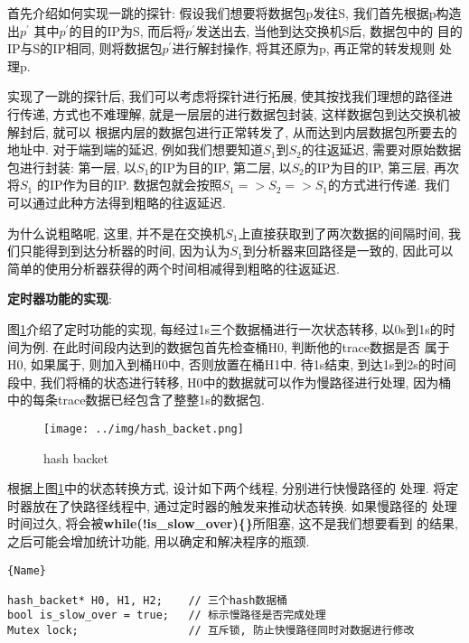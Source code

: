 首先介绍如何实现一跳的探针: 假设我们想要将数据包p发往S,
我们首先根据p构造出\(p^{'}\) 其中\(p^{'}\)的目的IP为S,
而后将\(p^{'}\)发送出去, 当他到达交换机S后, 数据包中的
目的IP与S的IP相同, 则将数据包\(p^{'}\)进行解封操作, 将其还原为p,
再正常的转发规则 处理p.

实现了一跳的探针后, 我们可以考虑将探针进行拓展,
使其按找我们理想的路径进行传递, 方式也不难理解,
就是一层层的进行数据包封装, 这样数据包到达交换机被解封后, 就可以
根据内层的数据包进行正常转发了, 从而达到内层数据包所要去的地址中.
对于端到端的延迟, 例如我们想要知道\(S_{1}\)到\(S_{2}\)的往返延迟,
需要对原始数据包进行封装: 第一层, 以\(S_{1}\)的IP为目的IP, 第二层,
以\(S_{2}\)的IP为目的IP, 第三层, 再次将\(S_{1}\) 的IP作为目的IP.
数据包就会按照\(S_{1} => S_{2} => S_{1}\)的方式进行传递. 我们
可以通过此种方法得到粗略的往返延迟.

为什么说粗略呢, 这里,
并不是在交换机\(S_{1}\)上直接获取到了两次数据的间隔时间,
我们只能得到到达分析器的时间, 因为认为\(S_{1}\)到分析器来回路径是一致的,
因此可以 简单的使用分析器获得的两个时间相减得到粗略的往返延迟.


\textbf{定时器功能的实现}:

图\ref{fig:hash_backet}介绍了定时功能的实现, 每经过1s三个数据桶进行一次状态转移,
以0s到1s的时间为例. 在此时间段内达到的数据包首先检查桶H0, 判断他的trace数据是否
属于H0, 如果属于, 则加入到桶H0中, 否则放置在桶H1中. 待1s结束, 到达1s到2s的时间段中,
我们将桶的状态进行转移, H0中的数据就可以作为慢路径进行处理,
因为桶中的每条trace数据已经包含了整整1s的数据包.

\begin{center}
\end{center}

\begin{figure}[htbp!]
  \centering 
  \texttt{[image: ../img/hash\_backet.png]}
  \caption{hash backet}
  \label{fig:hash_backet}
\end{figure}


  根据上图\ref{fig:hash_backet}中的状态转换方式, 设计如下两个线程, 分别进行快慢路径的
处理. 将定时器放在了快路径线程中, 通过定时器的触发来推动状态转换. 如果慢路径的
处理时间过久, 将会被\textbf{while(!is\_slow\_over)\{\}}所阻塞, 这不是我们想要看到
的结果, 之后可能会增加统计功能, 用以确定和解决程序的瓶颈.

\begin{lstlisting}[caption=数据结构,frame=tlrb]{Name}

hash_backet* H0, H1, H2;    // 三个hash数据桶
bool is_slow_over = true;   // 标示慢路径是否完成处理
Mutex lock;                 // 互斥锁, 防止快慢路径同时对数据进行修改

\end{lstlisting}

